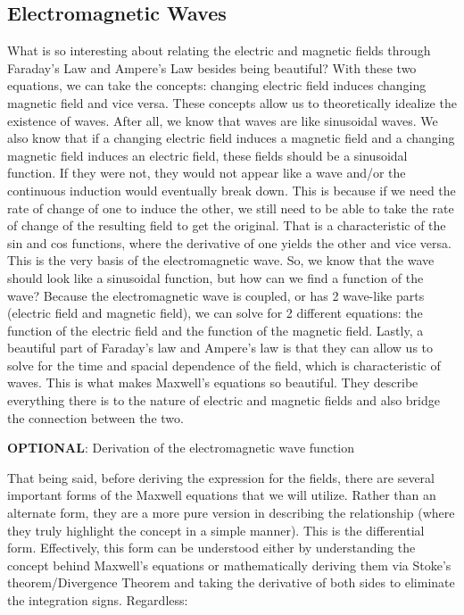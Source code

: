 \documentclass{article}
\begin{document}
\subsection{Electromagnetic Waves}
What is so interesting about relating the electric and magnetic fields through Faraday's Law and Ampere's Law besides being beautiful? With these two equations, we can take the concepts: changing electric field induces changing magnetic field and vice versa. These concepts allow us to theoretically idealize the existence of waves. After all, we know that waves are like sinusoidal waves. We also know that if a changing electric field induces a magnetic field and a changing magnetic field induces an electric field, these fields should be a sinusoidal function. If they were not, they would not appear like a wave and/or the continuous induction would eventually break down. This is because if we need the rate of change of one to induce the other, we still need to be able to take the rate of change of the resulting field to get the original. That is a characteristic of the sin and cos functions, where the derivative of one yields the other and vice versa. This is the very basis of the electromagnetic wave. So, we know that the wave should look like a sinusoidal function, but how can we find a function of the wave? Because the electromagnetic wave is coupled, or has 2 wave-like parts (electric field and magnetic field), we can solve for 2 different equations: the function of the electric field and the function of the magnetic field. Lastly, a beautiful part of Faraday's law and Ampere's law is that they can allow us to solve for the time and spacial dependence of the field, which is characteristic of waves. This is what makes Maxwell's equations so beautiful. They describe everything there is to the nature of electric and magnetic fields and also bridge the connection between the two.\\
\begin{centering}
\textbf{OPTIONAL}: Derivation of the electromagnetic wave function\\
\end{centering}
That being said, before deriving the expression for the fields, there are several important forms of the Maxwell equations that we will utilize. Rather than an alternate form, they are a more pure version in describing the relationship (where they truly highlight the concept in a simple manner). This is the differential form. Effectively, this form can be understood either by understanding the concept behind Maxwell's equations or mathematically deriving them via Stoke's theorem/Divergence Theorem and taking the derivative of both sides to eliminate the integration signs. Regardless:
\end{document}
